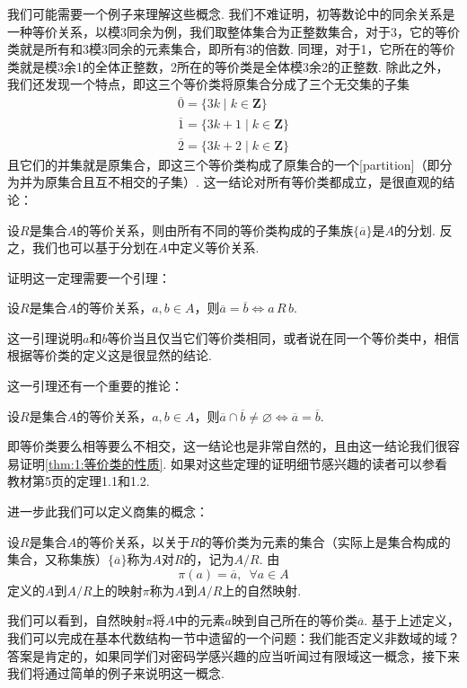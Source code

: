 我们可能需要一个例子来理解这些概念. 我们不难证明，初等数论中的同余关系是一种等价关系，以模3同余为例，我们取整体集合为正整数集合，对于3，它的等价类就是所有和3模3同余的元素集合，即所有3的倍数. 同理，对于1，它所在的等价类就是模3余1的全体正整数，2所在的等价类是全体模3余2的正整数. 除此之外，我们还发现一个特点，即这三个等价类将原集合分成了三个无交集的子集
\begin{gather*}
    \overline{0}=\{3k\mid k\in\mathbf{Z}\} \\
    \overline{1}=\{3k+1\mid k\in\mathbf{Z}\} \\
    \overline{2}=\{3k+2\mid k\in\mathbf{Z}\}
\end{gather*}
且它们的并集就是原集合，即这三个等价类构成了原集合的一个[partition]（即分为并为原集合且互不相交的子集）. 这一结论对所有等价类都成立，是很直观的结论：
\begin{theorem}\label{thm:1:等价类的性质}
    设$R$是集合$A$的等价关系，则由所有不同的等价类构成的子集族$\{\overline{a}\}$是$A$的分划. 反之，我们也可以基于分划在$A$中定义等价关系.
\end{theorem}

证明这一定理需要一个引理：
\begin{lemma}
    设$R$是集合$A$的等价关系，$a,b\in A$，则$\overline{a}=\overline{b}\iff a\,R\,b$.
\end{lemma}
这一引理说明$a$和$b$等价当且仅当它们等价类相同，或者说在同一个等价类中，相信根据等价类的定义这是很显然的结论.

这一引理还有一个重要的推论：
\begin{corollary}
    设$R$是集合$A$的等价关系，$a,b\in A$，则$\overline{a}\cap\overline{b}\neq\varnothing\iff\overline{a}=\overline{b}$.
\end{corollary}
即等价类要么相等要么不相交，这一结论也是非常自然的，且由这一结论我们很容易证明\autoref{thm:1:等价类的性质}. 如果对这些定理的证明细节感兴趣的读者可以参看教材第5页的定理1.1和1.2.

进一步此我们可以定义商集的概念：
\begin{definition}
    设$R$是集合$A$的等价关系，以关于$R$的等价类为元素的集合（实际上是集合构成的集合，又称集族）$\{\overline{a}\}$称为$A$对$R$的，记为$A/R$. 由
    \[\pi(a) = \overline{a}, \enspace \forall a\in A\]
    定义的$A$到$A/R$上的映射$\pi$称为$A$到$A/R$上的自然映射.
\end{definition}
我们可以看到，自然映射$\pi$将$A$中的元素$a$映到自己所在的等价类$\overline{a}$. 基于上述定义，我们可以完成在基本代数结构一节中遗留的一个问题：我们能否定义非数域的域？答案是肯定的，如果同学们对密码学感兴趣的应当听闻过有限域这一概念，接下来我们将通过简单的例子来说明这一概念.

